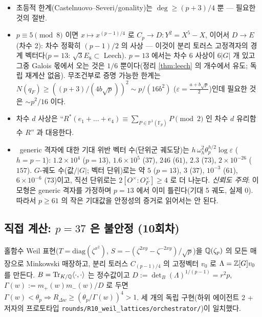 \begin{itemize}
\item 초등적 한계(Castelnuovo--Severi/gonality)는 $\deg\ge(p+3)/4$ 뿐 --- 필요한 것의 절반.
\item $p\equiv5\pmod8$ 이면 $x\mapsto x^{(p-1)/4}$ 로 $C_p\to D:Y^2=X^5-X$, 이어서 $D\to E$ (차수 2): 차수 정확히 $(p-1)/2$ 의 사상 --- 이것이 분리 토러스 고정격자의 경계 벡터다($p=13$: $\sqrt3E_8\subset$ Leech). $p=13$ 에서는 차수 6 사상이 $6|G|$ 개 있고 그중 Galois 몫에서 오는 것은 $1/6$ 뿐이다(정리 \ref{thm:leech} 의 개수에서 유도; 독립 재계산 없음). 무조건부로 증명 가능한 한계는 $N(q_F)\ge((p+3)/(4b\sqrt p))^2\sim p/(16b^2)$ ($\varepsilon=\tfrac{a+b\sqrt p}2$)인데 필요한 것은 $\sim p^2/16$ 이다.
\item 차수 $d$ 사상은 ``$R^*(e_1+\dots+e_4)\equiv\sum_{P\in\mathbb P^1(\mathbb F_p)}P\pmod2$ 인 차수 $d$ 유리함수 $R$'' 과 대응한다.
\item \tagH\ generic 격자에 대한 기대 위반 벡터 수(단위군 궤도당)는 $h\,\omega_h^2\theta_p^{h/2}\log\varepsilon$ ($h=p-1$): $1.2\times10^4$ ($p=13$), $1.6\times10^5$ ($37$), $246$ ($61$), $2.3$ ($73$), $2\times10^{-26}$ ($157$). $G$-궤도 수(값$/|G|$; 벡터 단위)로는 약 $5$ ($p=13$), $3$ ($37$), $10^{-3}$ ($61$), $6\times10^{-6}$ ($73$)이고, 직선 단위로는 $2[O^\times:O_F^\times]\ge4$ 로 더 나눈다. \emph{신뢰도 주의}: 이 모형은 generic 격자를 가정하며 $p=13$ 에서 이미 틀린다(기대 5 궤도, 실제 0). 따라서 $p\ge61$ 의 작은 기대값을 안정성의 증거로 읽어서는 안 된다.
\end{itemize}

\subsection{직접 계산: $p=37$ 은 불안정 (10회차)}\label{sec:weilcomp}
홀함수 Weil 표현($T=\mathrm{diag}(\zeta^{x^2})$, $S=-(\zeta^{2xy}-\zeta^{-2xy})/\sqrt p$)을 $\mathbb{Q}(\zeta_p)$ 의 모든 매장으로 Minkowski 매장하고, 분리 토러스 $C_{(p-1)/4}$ 의 고정벡터 $v_0$ 로 $\Lambda=\mathbb{Z}[G]v_0$ 를 만든다. $B=\mathrm{Tr}_{K/\mathbb{Q}}\langle\cdot,\cdot\rangle$ 는 정수값이고 $D:=\det_B(\Lambda)^{1/(p-1)}=r^2p$, $\Gamma(w):=m_+(w)m_-(w)/D$ 로 두면 $\Gamma(w)<\theta_p\Rightarrow R_{\Delta w}\ge(\theta_p/\Gamma(w))^4>1$. 세 개의 독립 구현(하위 에이전트 2 + 저자의 프로토타입 \texttt{rounds/R10\_weil\_lattices/orchestrator/})이 일치했다.

